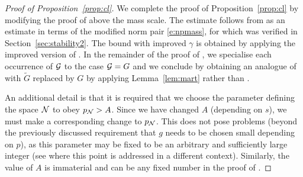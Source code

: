 \begin{proof}[Proof of Proposition~\ref{prop:cl}]
We complete the proof of Proposition~\ref{prop:cl} by modifying the proof of
\cite[Proposition~\ref{IE-prop:cl}]{BS-rg-IE} above the mass scale.
The estimate \cite[\eqref{IE-e:Lkpfii-1zbis}]{BS-rg-IE}
follows from \cite[Proposition~\ref{IE-prop:ip}]{BS-rg-IE}
as an estimate in terms of the modified norm pair \eqref{e:npmass},
for which \cite[Proposition~\ref{IE-prop:ip}]{BS-rg-IE} was verified in Section~\ref{sec:stability2}.
The bound \cite[\eqref{IE-e:cl-1}]{BS-rg-IE} with improved $\gamma$ is obtained by applying the improved
version of \cite[Proposition~\ref{IE-prop:1-LTdefXY}]{BS-rg-IE}. In the remainder
of the proof of \cite[Proposition~\ref{IE-prop:cl}]{BS-rg-IE}, we specialise each
occurrence of $\mathcal{G}$ to the case $\mathcal{G} = G$ and we conclude by obtaining an
analogue of \cite[\eqref{IE-e:FXbdKzzz}]{BS-rg-IE} with $\tilde G$ replaced by
$G$ by applying Lemma~\ref{lem:mart} rather than \cite[Lemma~\ref{IE-lem:mart}]{BS-rg-IE}.

An additional detail is that it is required that we choose the parameter defining the space $\mathcal{N}$ to
obey $p_{\mathcal{N}} >A$.
Since we have changed $A$ (depending on $s$), we must make a corresponding change to $p_{\mathcal{N}}$. This does not pose problems
(beyond the previously discussed requirement that $g$ needs to be chosen small depending on $p$),
as this parameter may be
fixed to be an arbitrary and sufficiently large integer
(see \cite[Section~\ref{phi4-sec:pNcal}]{ST-phi4} where this point is addressed
in a different context).  Similarly, the value of $A$ is immaterial and can be
any fixed number in the proof of
\cite[Proposition \ref{IE-prop:cl}]{BS-rg-IE}.
\end{proof}